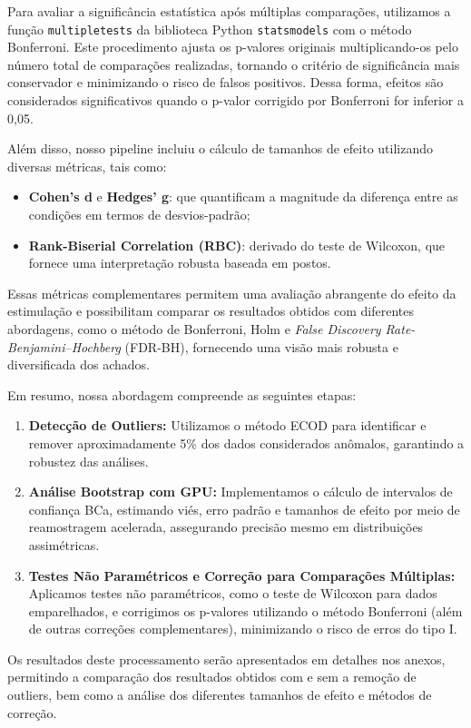 Para avaliar a significância estatística após múltiplas comparações, utilizamos a função \texttt{multipletests} da biblioteca Python \texttt{statsmodels} com o método Bonferroni. Este procedimento ajusta os p-valores originais multiplicando-os pelo número total de comparações realizadas, tornando o critério de significância mais conservador e minimizando o risco de falsos positivos. Dessa forma, efeitos são considerados significativos quando o p-valor corrigido por Bonferroni for inferior a 0,05.

Além disso, nosso pipeline incluiu o cálculo de tamanhos de efeito utilizando diversas métricas, tais como:
\begin{itemize}
    \item \textbf{Cohen's d} e \textbf{Hedges' g}: que quantificam a magnitude da diferença entre as condições em termos de desvios-padrão;
    \item \textbf{Rank-Biserial Correlation (RBC)}: derivado do teste de Wilcoxon, que fornece uma interpretação robusta baseada em postos.
\end{itemize}

Essas métricas complementares permitem uma avaliação abrangente do efeito da estimulação e possibilitam comparar os resultados obtidos com diferentes abordagens, como o método de Bonferroni, Holm e \textit{False Discovery Rate-Benjamini–Hochberg} (FDR-BH), fornecendo uma visão mais robusta e diversificada dos achados.

Em resumo, nossa abordagem compreende as seguintes etapas:
\begin{enumerate}
    \item \textbf{Detecção de Outliers:} Utilizamos o método ECOD para identificar e remover aproximadamente 5\% dos dados considerados anômalos, garantindo a robustez das análises.
    \item \textbf{Análise Bootstrap com GPU:} Implementamos o cálculo de intervalos de confiança BCa, estimando viés, erro padrão e tamanhos de efeito por meio de reamostragem acelerada, assegurando precisão mesmo em distribuições assimétricas.
    \item \textbf{Testes Não Paramétricos e Correção para Comparações Múltiplas:} Aplicamos testes não paramétricos, como o teste de Wilcoxon para dados emparelhados, e corrigimos os p-valores utilizando o método Bonferroni (além de outras correções complementares), minimizando o risco de erros do tipo I.
\end{enumerate}

Os resultados deste processamento serão apresentados em detalhes nos anexos, permitindo a comparação dos resultados obtidos com e sem a remoção de outliers, bem como a análise dos diferentes tamanhos de efeito e métodos de correção.

